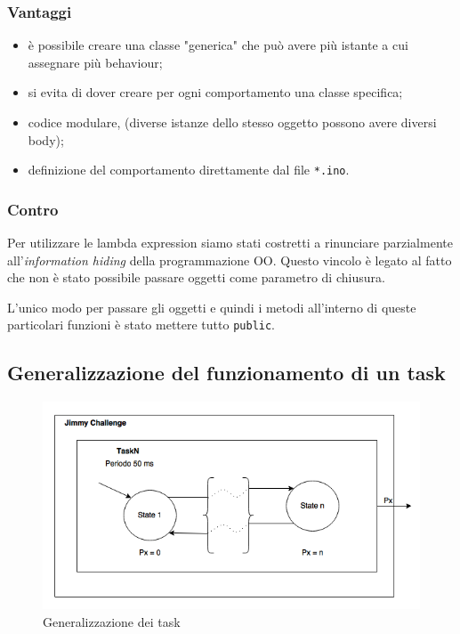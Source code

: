 \subsubsection{Vantaggi}
\begin{itemize}
	\item è possibile creare una classe "generica" che può avere più istante a cui assegnare più behaviour;
	\item si evita di dover creare per ogni comportamento una classe specifica;
	\item codice modulare, (diverse istanze dello stesso oggetto possono avere diversi body);
	\item definizione del comportamento direttamente dal file \texttt{*.ino}.
\end{itemize}

\subsubsection{Contro}
Per utilizzare le lambda expression siamo stati costretti a rinunciare parzialmente all'\textit{information hiding} della programmazione OO. Questo vincolo è legato al fatto che non è stato possibile passare oggetti come parametro di chiusura.

L'unico modo per passare gli oggetti e quindi i metodi all'interno di queste particolari funzioni è stato mettere tutto \texttt{public}.

\subsection{Generalizzazione del funzionamento di un task}
\begin{figure}[!ht]
	\centering
	\includegraphics[scale=.60]{img/task_generic.png}
	\caption{Generalizzazione dei task}
\end{figure}

